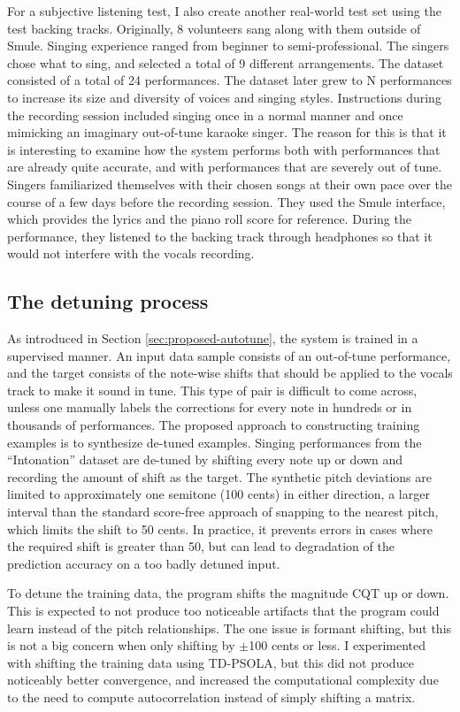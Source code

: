 For a subjective listening test, I also create another real-world test set using the test backing tracks. Originally, 8 volunteers sang along with them outside of Smule. Singing experience ranged from beginner to semi-professional. The singers chose what to sing, and selected a total of 9 different arrangements. The dataset consisted of a total of 24 performances. The dataset later grew to N performances to increase its size and diversity of voices and singing styles. Instructions during the recording session included singing once in a normal manner and once mimicking an imaginary out-of-tune karaoke singer. The reason for this is that it is interesting to examine how the system performs both with performances that are already quite accurate, and with performances that are severely out of tune. Singers familiarized themselves with their chosen songs at their own pace over the course of a few days before the recording session. They used the Smule interface, which provides the lyrics and the piano roll score for reference. During the performance, they listened to the backing track through headphones so that it would not interfere with the vocals recording.

\subsection{The detuning process}
As introduced in Section \ref{sec:proposed-autotune}, the system is trained in a supervised manner. An input data sample consists of an out-of-tune performance, and the target consists of the note-wise shifts that should be applied to the vocals track to make it sound in tune. This type of pair is difficult to come across, unless one manually labels the corrections for every note in hundreds or in thousands of performances. The proposed approach to constructing training examples is to synthesize de-tuned examples. Singing performances from the ``Intonation'' dataset are de-tuned by shifting every note up or down and recording the amount of shift as the target. The synthetic pitch deviations are limited to approximately one semitone (100 cents) in either direction, a larger interval than the standard score-free approach of snapping to the nearest pitch, which limits the shift to 50 cents. In practice, it prevents errors in cases where the required shift is greater than 50, but can lead to degradation of the prediction accuracy on a too badly detuned input. 

To detune the training data, the program shifts the magnitude CQT up or down. This is expected to not produce too noticeable artifacts that the program could learn instead of the pitch relationships. The one issue is formant shifting, but this is not a big concern when only shifting by $\pm$100 cents or less. I experimented with shifting the training data using TD-PSOLA, but this did not produce noticeably better convergence, and increased the computational complexity due to the need to compute autocorrelation instead of simply shifting a matrix. 

